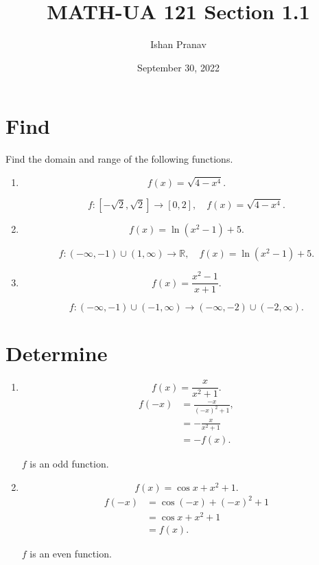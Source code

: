 \documentclass[12pt]{article}
\title{MATH-UA 121 Section 1.1}
\author{Ishan Pranav}
\date{September 30, 2022}
\begin{document}
\maketitle
\section{Find}
Find the domain and range of the following functions.
\begin{enumerate}
\item
\[f(x)=\sqrt{4-x^4}.\]

\[f:\left[-\sqrt{2},\sqrt{2}\right]\to[0,2],\quad f(x)=\sqrt{4-x^4}.\]
\item
\[f(x)=\ln(x^2-1)+5.\]

\[f:(-\infty,-1)\cup(1,\infty)\to\mathbb{R},\quad f(x)=\ln(x^2-1)+5.\]
\item
\[f(x)=\frac{x^2-1}{x+1}.\]

\[f:(-\infty,-1)\cup(-1,\infty)\to(-\infty,-2)\cup(-2,\infty).\]
\end{enumerate}
\section{Determine}
\begin{enumerate}
\item
\[f(x)=\frac{x}{x^2+1}.\]
\begin{align}
    f(-x)
    &=\frac{-x}{(-x)^2+1},\\
    &=-\frac{x}{x^2+1}\\
    &=-f(x).
\end{align}

$f$ is an odd function.
\item
\[f(x)=\cos{x}+x^2+1.\]
\begin{align}
    f(-x)
    &=\cos(-x)+(-x)^2+1\\
    &=\cos{x}+x^2+1\\
    &=f(x).
\end{align}

$f$ is an even function.
\end{enumerate}
\end{document}
